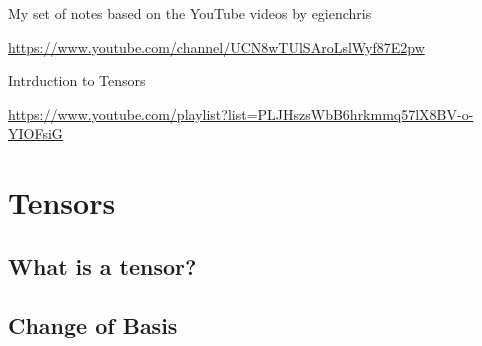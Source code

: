 \documentclass[a5paper,12pt]{book}
\begin{document}

\frontmatter
{}
My set of notes based on the YouTube videos by egienchris

\url{https://www.youtube.com/channel/UCN8wTUlSAroLslWyf87E2pw}\linebreak

Intrduction to Tensors

\url{https://www.youtube.com/playlist?list=PLJHszsWbB6hrkmmq57lX8BV-o-YIOFsiG}
\tableofcontents
\listoftables
\listoffigures
\clearpage
\mainmatter
\chapter{Tensors}
\section{What is a tensor?}

\clearpage
\section{Change of Basis}


\clearpage
{}
\printindex
\end{document}
